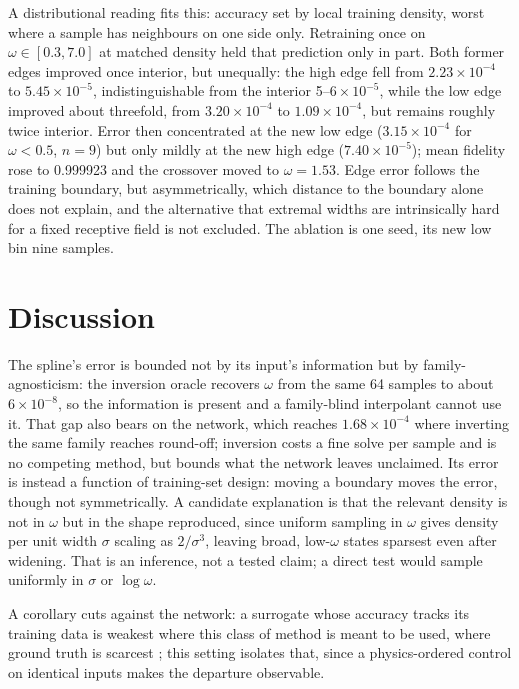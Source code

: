 \documentclass{article}
\begin{document}
A distributional reading fits this: accuracy set by local training density, worst
where a sample has neighbours on one side only. Retraining once on
$\omega \in [0.3, 7.0]$ at matched density held that prediction only in part.
Both former edges improved once interior, but unequally: the high edge fell from
$2.23 \times 10^{-4}$ to $5.45 \times 10^{-5}$, indistinguishable from the
interior 5--$6 \times 10^{-5}$, while the low edge improved about threefold, from
$3.20 \times 10^{-4}$ to $1.09 \times 10^{-4}$, but remains roughly twice
interior. Error then concentrated at the new low edge ($3.15 \times 10^{-4}$ for
$\omega < 0.5$, $n = 9$) but only mildly at the new high edge
($7.40 \times 10^{-5}$); mean fidelity rose to 0.999923 and the crossover moved
to $\omega = 1.53$. Edge error follows the training boundary, but
asymmetrically, which distance to the boundary alone does not explain, and the
alternative that extremal widths are intrinsically hard for a fixed receptive
field is not excluded. The ablation is one seed, its new low bin nine samples.

\section{Discussion}
\label{sec:discussion}

The spline's error is bounded not by its input's information but by
family-agnosticism: the inversion oracle recovers $\omega$ from the same 64
samples to about $6 \times 10^{-8}$, so the information is present and a
family-blind interpolant cannot use it. That gap also bears on the
network, which reaches $1.68 \times 10^{-4}$ where inverting the same family
reaches round-off; inversion costs a fine solve per sample and is no competing
method, but bounds what the network leaves unclaimed. Its error is instead a
function of training-set design: moving a boundary moves the error, though not
symmetrically. A candidate explanation is that the relevant density is not in
$\omega$ but in the shape reproduced, since uniform sampling in $\omega$ gives
density per unit width $\sigma$ scaling as $2/\sigma^{3}$, leaving broad,
low-$\omega$ states sparsest even after widening. That is an
inference, not a tested claim; a direct test would sample uniformly in $\sigma$
or $\log\omega$.

A corollary cuts against the network: a surrogate whose accuracy tracks its
training data is weakest where this class of method is meant to be used, where
ground truth is scarcest \citep{mouli2024, gopakumar2026}; this setting isolates
that, since a physics-ordered control on identical inputs makes the departure
observable.
\end{document}
